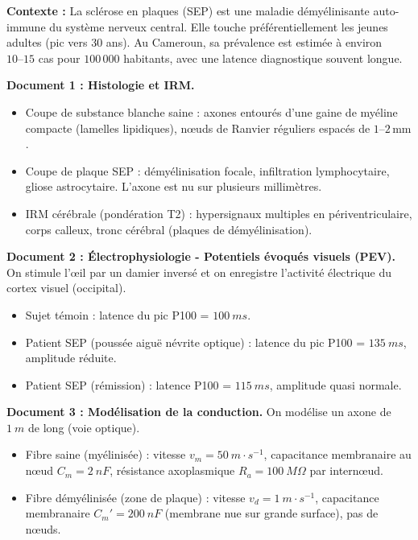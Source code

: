 \documentclass[11pt]{article}
\begin{document}
\begin{exercice}
\textbf{Contexte :} La sclérose en plaques (SEP) est une maladie démyélinisante auto-immune du système nerveux central. Elle touche préférentiellement les jeunes adultes (pic vers 30 ans). Au Cameroun, sa prévalence est estimée à environ $10\text{--}15$ cas pour $100\,000$ habitants, avec une latence diagnostique souvent longue.

\textbf{Document 1 : Histologie et IRM.}
\begin{itemize}
    \item Coupe de substance blanche saine : axones entourés d'une gaine de myéline compacte (lamelles lipidiques), nœuds de Ranvier réguliers espacés de $1\text{--}2\,\text{mm}$.
    \item Coupe de plaque SEP : démyélinisation focale, infiltration lymphocytaire, gliose astrocytaire. L'axone est nu sur plusieurs millimètres.
    \item IRM cérébrale (pondération T2) : hypersignaux multiples en périventriculaire, corps calleux, tronc cérébral (plaques de démyélinisation).
\end{itemize}

\textbf{Document 2 : Électrophysiologie - Potentiels évoqués visuels (PEV).}
On stimule l'œil par un damier inversé et on enregistre l'activité électrique du cortex visuel (occipital).
\begin{itemize}
    \item Sujet témoin : latence du pic P100 = $\SI{100}{ms}$.
    \item Patient SEP (poussée aiguë névrite optique) : latence du pic P100 = $\SI{135}{ms}$, amplitude réduite.
    \item Patient SEP (rémission) : latence P100 = $\SI{115}{ms}$, amplitude quasi normale.
\end{itemize}

\textbf{Document 3 : Modélisation de la conduction.}
On modélise un axone de $\SI{1}{m}$ de long (voie optique).
\begin{itemize}
    \item Fibre saine (myélinisée) : vitesse $v_m = \SI{50}{m\cdot s^{-1}}$, capacitance membranaire au nœud $C_m = \SI{2}{nF}$, résistance axoplasmique $R_a = \SI{100}{M\Omega}$ par internœud.
    \item Fibre démyélinisée (zone de plaque) : vitesse $v_d = \SI{1}{m\cdot s^{-1}}$, capacitance membranaire $C_m' = \SI{200}{nF}$ (membrane nue sur grande surface), pas de nœuds.
\end{itemize}


\end{exercice}
\end{document}
